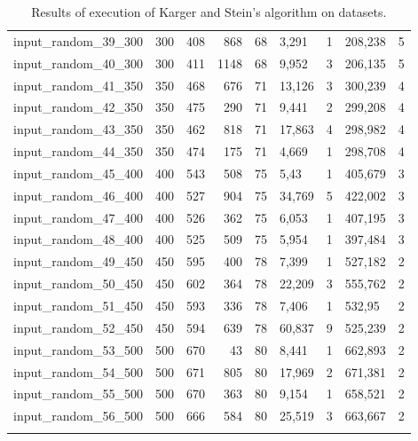 \begin{landscape}
\begin{longtable}{|l|r|r|r|r|l|r|l|r|}
    input\_random\_39\_300 & 300   & 408   & 868   & 68    & 3,291  & 1     & 208,238   & 5   \\
    input\_random\_40\_300 & 300   & 411   & 1148  & 68    & 9,952  & 3     & 206,135   & 5   \\
    input\_random\_41\_350 & 350   & 468   & 676   & 71    & 13,126 & 3     & 300,239   & 4   \\
    input\_random\_42\_350 & 350   & 475   & 290   & 71    & 9,441  & 2     & 299,208   & 4   \\
    input\_random\_43\_350 & 350   & 462   & 818   & 71    & 17,863 & 4     & 298,982   & 4   \\
    input\_random\_44\_350 & 350   & 474   & 175   & 71    & 4,669  & 1     & 298,708   & 4   \\
    input\_random\_45\_400 & 400   & 543   & 508   & 75    & 5,43   & 1     & 405,679   & 3   \\
    input\_random\_46\_400 & 400   & 527   & 904   & 75    & 34,769 & 5     & 422,002   & 3   \\
    input\_random\_47\_400 & 400   & 526   & 362   & 75    & 6,053  & 1     & 407,195   & 3   \\
    input\_random\_48\_400 & 400   & 525   & 509   & 75    & 5,954  & 1     & 397,484   & 3   \\
    input\_random\_49\_450 & 450   & 595   & 400   & 78    & 7,399  & 1     & 527,182   & 2   \\
    input\_random\_50\_450 & 450   & 602   & 364   & 78    & 22,209 & 3     & 555,762   & 2   \\
    input\_random\_51\_450 & 450   & 593   & 336   & 78    & 7,406  & 1     & 532,95    & 2   \\
    input\_random\_52\_450 & 450   & 594   & 639   & 78    & 60,837 & 9     & 525,239   & 2   \\
    input\_random\_53\_500 & 500   & 670   & 43    & 80    & 8,441  & 1     & 662,893   & 2   \\
    input\_random\_54\_500 & 500   & 671   & 805   & 80    & 17,969 & 2     & 671,381   & 2   \\
    input\_random\_55\_500 & 500   & 670   & 363   & 80    & 9,154  & 1     & 658,521   & 2   \\
    input\_random\_56\_500 & 500   & 666   & 584   & 80    & 25,519 & 3     & 663,667   & 2   \\
    \hline
    \captionsetup{width=1.75\textwidth}
    \caption{Results of execution of Karger and Stein's algorithm on datasets.}
\end{longtable}
\end{landscape}
